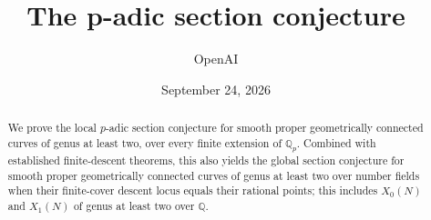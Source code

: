 \documentclass[11pt]{article}
\title{The p-adic section conjecture}
\author{OpenAI}
\date{September 24, 2026}
\numberwithin{equation}{section}
\theoremstyle{remark}
\begin{document}
\maketitle
\begin{abstract}
We prove the local $p$-adic section conjecture for smooth proper
geometrically connected curves of genus at least two, over every finite
extension of $\mathbb Q_p$.
Combined with established finite-descent theorems, this also yields the
global section conjecture for smooth proper geometrically connected
curves of genus at least two over number fields when their finite-cover
descent locus equals their rational points; this includes $X_0(N)$ and
$X_1(N)$ of genus at least two over $\mathbb Q$.
\end{abstract}
\tableofcontents








\begingroup
\raggedright


\endgroup
\end{document}
